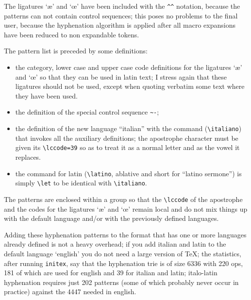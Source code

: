 The  ligatures  `\ae'  and  `\oe'  have  been  included  with  the \verb|^^|
notation, because the patterns can not contain control sequences; this poses
no  problems to the final user, because the hyphenation algorithm is applied
after all macro expansions have been reduced to non expandable tokens.

The pattern list is preceded by some definitions:
\begin{itemize}

\item  the  category,  lower  case  and  upper case code definitions for the
ligatures `\ae' and `\oe' so that they can be used in latin text;  I  stress
again  that these ligatures should not be used, except when quoting verbatim
some text where they have been used.

\item the definition of the special control sequence \verb|~-|;

\item  the  definition  of  the  new  language  ``italian'' with the command
(\verb|\italiano|)  that  invokes  all  the  auxiliary   definitions;    the
apostrophe  character  must be given its \verb"\lccode=39" so as to treat it
as a normal letter and as the vowel it replaces.


\item the command for latin (\verb'\latino', ablative and short for ``latino
sermone'') is simply \verb'\let' to be identical with \verb'\italiano'.

\end{itemize}

The  patterns  are enclosed within a group so that the \verb'\lccode' of the
apostrophe and the codes for the ligatures `\ae' and `\oe' remain local  and
do  not  mix  things up with the default language and/or with the previously
defined languages.

Adding  these  hyphenation  patterns  to  the  format  that  has one or more
languages already defined is not a heavy overhead; if you  add  italian  and
latin  to  the default language `english' you do not need a large version of
\TeX; the statistics, after running {\tt initex}, say that  the  hyphenation
trie  is of size 6336 with 220 ops, 181 of which are used for english and 39
for italian and latin; italo-latin hyphenation requires  just  202  patterns
(some  of which probably never occur in practice) against the 4447 needed in
english.

